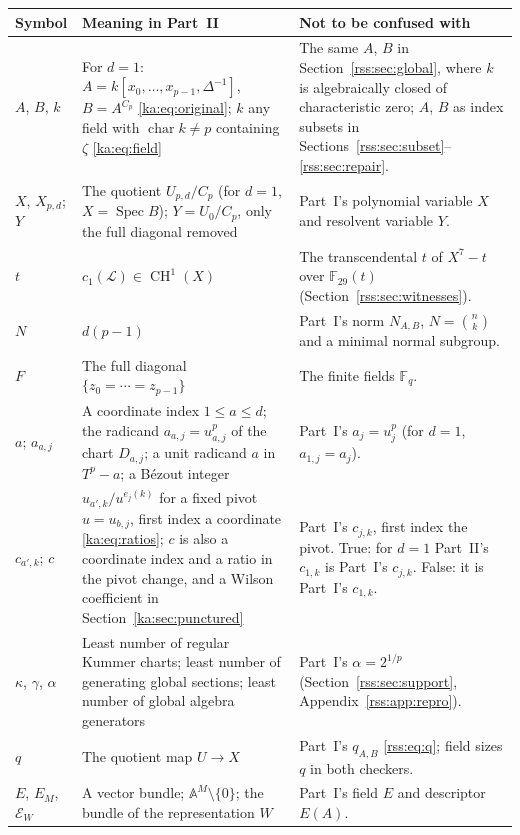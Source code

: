 \documentclass[11pt,a4paper]{article}
\theoremstyle{definition}
\theoremstyle{remark}
\newcommand{\F}{\mathbb F}
\newcommand{\Spec}{\operatorname{Spec}}
\newcommand{\charac}{\operatorname{char}}
\newcommand{\A}{\mathbb A}
\newcommand{\LL}{\mathcal L}
\newcommand{\EE}{\mathcal E}
\newcommand{\CH}{\operatorname{CH}}
\newcommand{\atlas}{\kappa}
\newcommand{\gen}{\gamma}
\newcommand{\alggen}{\alpha}
\begin{document}
\begin{center}
\small
\begin{tabularx}{\textwidth}{@{}L{0.15\textwidth}>{\raggedright\arraybackslash}X>{\raggedright\arraybackslash}X@{}}
\toprule
Symbol & Meaning in Part~II & Not to be confused with\\
\midrule
$A$, $B$, $k$ &
For $d=1$: $A=k[x_0,\ldots,x_{p-1},\Delta^{-1}]$, $B=A^{C_p}$
\eqref{ka:eq:original}; $k$ any field with $\charac k\neq p$ containing
$\zeta$ \eqref{ka:eq:field} &
The same $A$, $B$ in Section~\ref{rss:sec:global}, where $k$ is
algebraically closed of characteristic zero; $A$, $B$ as index subsets in
Sections~\ref{rss:sec:subset}--\ref{rss:sec:repair}.\\
$X$, $X_{p,d}$; $Y$ &
The quotient $U_{p,d}/C_p$ (for $d=1$, $X=\Spec B$); $Y=U_0/C_p$, only the
full diagonal removed &
Part~I's polynomial variable $X$ and resolvent variable $Y$.\\
$t$ &
$c_1(\LL)\in\CH^1(X)$ &
The transcendental $t$ of $X^7-t$ over $\F_{29}(t)$
(Section~\ref{rss:sec:witnesses}).\\
$N$ &
$d(p-1)$ &
Part~I's norm $N_{A,B}$, $N=\binom nk$ and a minimal normal subgroup.\\
$F$ &
The full diagonal $\{z_0=\cdots=z_{p-1}\}$ &
The finite fields $\F_q$.\\
$a$; $a_{a,j}$ &
A coordinate index $1\le a\le d$; the radicand $a_{a,j}=u_{a,j}^p$ of the
chart $D_{a,j}$; a unit radicand $a$ in $T^p-a$; a B\'ezout integer &
Part~I's $a_j=u_j^p$ (for $d=1$, $a_{1,j}=a_j$).\\
$c_{a',k}$; $c$ &
$u_{a',k}/u^{e_j(k)}$ for a fixed pivot $u=u_{b,j}$, first index a
coordinate \eqref{ka:eq:ratios}; $c$ is also a coordinate index and a ratio
in the pivot change, and a Wilson coefficient in Section~\ref{ka:sec:punctured} &
Part~I's $c_{j,k}$, first index the pivot. True: for $d=1$ Part~II's
$c_{1,k}$ is Part~I's $c_{j,k}$. False: it is Part~I's $c_{1,k}$.\\
$\atlas$, $\gen$, $\alggen$ &
Least number of regular Kummer charts; least number of generating global
sections; least number of global algebra generators &
Part~I's $\alpha=2^{1/p}$ (Section~\ref{rss:sec:support},
Appendix~\ref{rss:app:repro}).\\
$q$ &
The quotient map $U\to X$ &
Part~I's $q_{A,B}$ \eqref{rss:eq:q}; field sizes $q$ in both checkers.\\
$E$, $E_M$, $\EE_W$ &
A vector bundle; $\A^M\setminus\{0\}$; the bundle of the representation $W$ &
Part~I's field $E$ and descriptor $E(A)$.\\

\end{tabularx}
\end{center}
\end{document}
